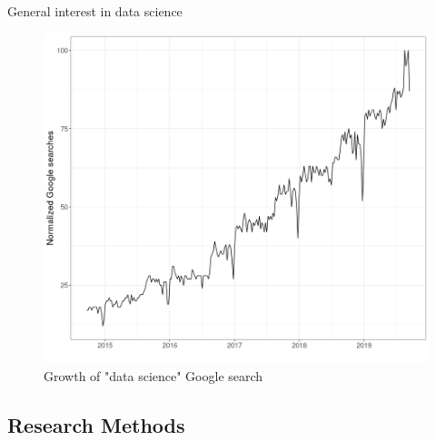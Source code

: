 \documentclass{beamer}
\begin{document}
\begin{frame}{General interest in data science}
    \begin{figure}
    \includegraphics[width = .8\framewidth]{png/ds-searches.png}
    \caption{Growth of "data science" Google search}
    \end{figure}
\end{frame}

\subsection{Research Methods}
\end{document}
